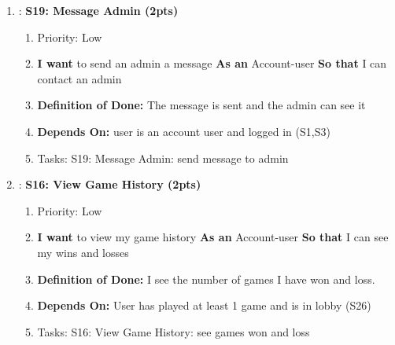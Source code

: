 \begin{enumerate}
    \item: \textbf{S19: Message Admin (2pts)}
    \begin{enumerate}
        \item Priority: Low 
        \item \textbf{I want} to send an admin a message \textbf{As an} Account-user \textbf{So that} I can contact an admin
        \item \textbf{Definition of Done:} The message is sent and the admin can see it
        \item \textbf{Depends On:} user is an account user and logged in (S1,S3)
        \item Tasks: S19: Message Admin: send message to admin
    \end{enumerate}

    \item: \textbf{S16: View Game History (2pts)}
    \begin{enumerate}
        \item Priority: Low
        \item \textbf{I want} to view my game history \textbf{As an} Account-user \textbf{So that} I can see my wins and losses
        \item \textbf{Definition of Done:} I see the number of games I have won and loss.
        \item \textbf{Depends On:} User has played at least 1 game and is in lobby (S26)
        \item Tasks: S16: View Game History: see games won and loss
    \end{enumerate}
    
\end{enumerate}

